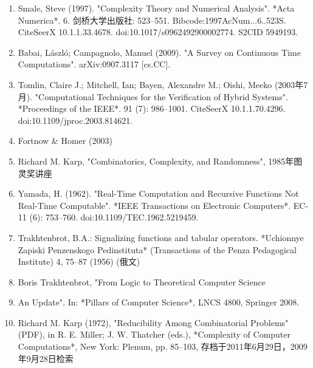 \begin{enumerate}
\item Smale, Steve (1997). "Complexity Theory and Numerical Analysis". *Acta Numerica*. 6. 剑桥大学出版社: 523–551. Bibcode:1997AcNum...6..523S. CiteSeerX 10.1.1.33.4678. doi:10.1017/s0962492900002774. S2CID 5949193.
\item Babai, László; Campagnolo, Manuel (2009). "A Survey on Continuous Time Computations". arXiv:0907.3117 [cs.CC].
\item Tomlin, Claire J.; Mitchell, Ian; Bayen, Alexandre M.; Oishi, Meeko (2003年7月). "Computational Techniques for the Verification of Hybrid Systems". *Proceedings of the IEEE*. 91 (7): 986–1001. CiteSeerX 10.1.1.70.4296. doi:10.1109/jproc.2003.814621.
\item Fortnow & Homer (2003)
\item Richard M. Karp, "Combinatorics, Complexity, and Randomness", 1985年图灵奖讲座
\item Yamada, H. (1962). "Real-Time Computation and Recursive Functions Not Real-Time Computable". *IEEE Transactions on Electronic Computers*. EC-11 (6): 753–760. doi:10.1109/TEC.1962.5219459.
\item Trakhtenbrot, B.A.: Signalizing functions and tabular operators. *Uchionnye Zapiski Penzenskogo Pedinstituta* (Transactions of the Penza Pedagogical Institute) 4, 75–87 (1956) (俄文)
\item Boris Trakhtenbrot, "From Logic to Theoretical Computer Science \item An Update". In: *Pillars of Computer Science*, LNCS 4800, Springer 2008.
\item Richard M. Karp (1972), "Reducibility Among Combinatorial Problems" (PDF), in R. E. Miller; J. W. Thatcher (eds.), *Complexity of Computer Computations*, New York: Plenum, pp. 85–103, 存档于2011年6月29日，2009年9月28日检索
\end{enumerate}
  
  




 
